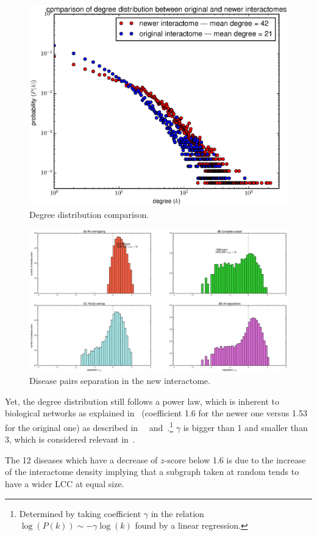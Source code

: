 \documentclass[letterpaper]{article}
\begin{document}
	\begin{figure}[!h]
		\includegraphics[width=.5\textwidth]{images/degree_distributions_comparison.eps}
		\caption{Degree distribution comparison.\label{fig:degree distribution comparison}}
	\end{figure}

	\begin{figure}[!t]
		\hspace{-1.8cm}
		\includegraphics[scale=.35]{images/new_interactome_s_AB_histogram.eps}
		\caption{Disease pairs separation in the new interactome.\label{fig:new interactome s_AB}}
	\end{figure}

	Yet, the degree distribution still follows a power law, which is inherent to biological networks as explained
	in~\cite{InteractomeNetworksAndHumanDisease} (coefficient 1.6 for the newer one versus 1.53 for the original one)
	as described in~~\cite{UnderstandingTheCellFunctionalOrganization} and~\cite{ProteinProteinInteractionNetworks}.\footnote{
	Determined by taking coefficient $\gamma$ in the relation $\log(P(k)) \sim -\gamma\log(k)$ found by a linear regression.}
	$\gamma$ is bigger than 1 and smaller than 3, which is considered relevant in~\cite{UnderstandingTheCellFunctionalOrganization}.

	The 12 diseases which have a decrease of $z$-score below 1.6 is due to the increase of the interactome density implying
	that a subgraph taken at random tends to have a wider LCC at equal size.
\end{document}
